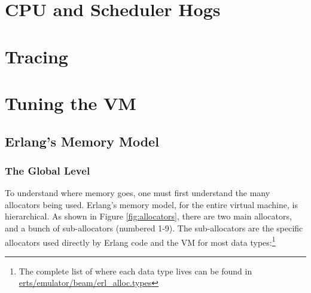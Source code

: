 \documentclass[11pt, oneside]{book}   	%
\begin{document}
\chapter{CPU and Scheduler Hogs}


\chapter{Tracing}
\label{chap:tracing}

\chapter{Tuning the VM}
\label{chap:tuning}







\section{Erlang's Memory Model}
\label{sec:erlang-memory-model}

\subsection{The Global Level}
\label{subsec:memory-global-level}

To understand where memory goes, one must first understand the many allocators being used. Erlang's memory model, for the entire virtual machine, is hierarchical. As shown in Figure \ref{fig:allocators},  there are two main allocators, and a bunch of sub-allocators (numbered 1-9). The sub-allocators are the specific allocators used directly by Erlang code and the VM for most data types:\footnote{The complete list of where each data type lives can be found in \href{https://github.com/erlang/otp/blob/maint/erts/emulator/beam/erl\_alloc.types}{erts/emulator/beam/erl\_alloc.types}}
\end{document}
